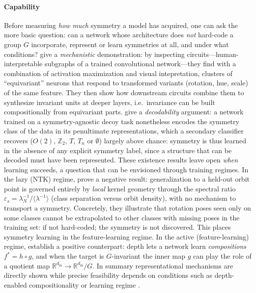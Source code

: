 \documentclass[mathematics,review,submit,moreauthors]{Definitions/mdpi}
\begin{document}
\paragraph{Capability}
Before measuring \emph{how much} symmetry a model has acquired, one can ask the more basic question: can a network whose architecture does \emph{not} hard-code a group $G$ incorporate, represent or learn symmetries at all, and under what conditions?
\citet{olah2020d} give a \emph{mechanistic} demonstration: by inspecting circuits---human-interpretable subgraphs of a trained convolutional network---they find with a combination of activation maximization and visual intepretation, clusters of ``equivariant'' neurons that respond to transformed variants (rotation, hue, scale) of the same feature.
They then show how downstream circuits combine them to synthesize invariant units at deeper layers, i.e.\ invariance can be built compositionally from equivariant parts.
\citet{barenboim2021sp} give a \emph{decodability} argument: a network trained on a symmetry-agnostic decoy task nonetheless encodes the symmetry class of the data in its penultimate representations, which a secondary classifier recovers ($O(2)$, $\mathbb{Z}_2$, $T$, $T_n$ or $\emptyset$) largely above chance: symmetry is thus learned in the absence of any explicit symmetry label, since a structure that can be decoded must have been represented.\newline
These existence results leave open \emph{when} learning succeeds, a question that can be envisioned through training regimes.
In the lazy (NTK) regime, \citet{perin2025} prove a negative result: generalization to a held-out orbit point is governed entirely by \emph{local} kernel geometry through the spectral ratio $\varepsilon_s = \lambda_N^{-1}/\langle\lambda^{-1}\rangle$ (class separation versus orbit density), with no mechanism to transport a symmetry.
Concretely, they illustrate that rotation poses seen only on some classes cannot be extrapolated to other classes with missing poses in the training set: if not hard-coded; the symmetry is not discovered.
This places symmetry learning in the feature-learning regime.
In the active (feature-learning) regime, \citet{jacot2025} establish a positive counterpart: depth lets a network learn \emph{compositions} $f^\ast = h \circ g$, and when the target is $G$-invariant the inner map $g$ can play the role of a quotient map $\mathbb{R}^{d_{\mathrm{in}}} \to \mathbb{R}^{d_{\mathrm{in}}}/G$.
In summary representational mechanisms are directly shown \citep{olah2020d,barenboim2021sp} while precise feasibility depends on conditions such as depth-enabled compositionality or learning regime \citep{perin2025,jacot2025}.
\end{document}
